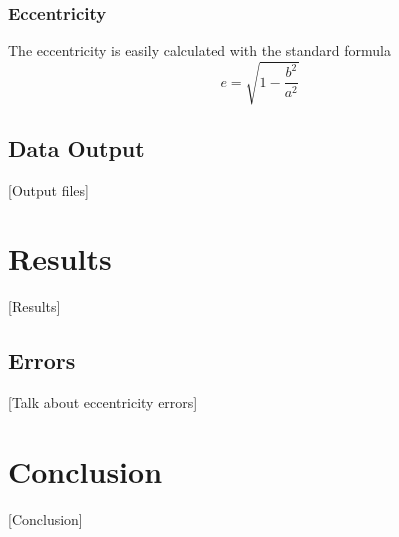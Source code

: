 \documentclass[a4paper,12pt]{article} %
\numberwithin{equation}{section} %
\numberwithin{figure}{section} %
\begin{document}
\subsubsection{Eccentricity}

The eccentricity is easily calculated with the standard formula $$e=\sqrt{1-\frac{b^2}{a^2}}$$

\subsection{Data Output}
[Output files]

\section{Results}

[Results]

\subsection{Errors}

[Talk about eccentricity errors]

\section{Conclusion}

[Conclusion]



\end{document}
